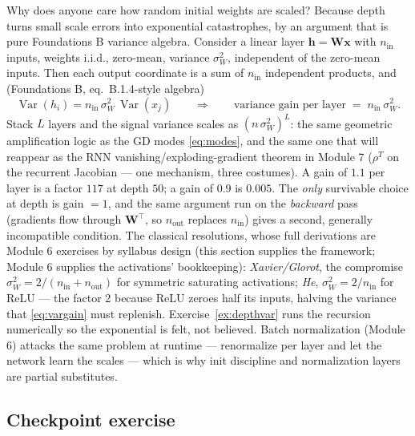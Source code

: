 \documentclass[11pt]{article}
\numberwithin{equation}{section}
\theoremstyle{plain}
\theoremstyle{definition}
\theoremstyle{remark}
\newcounter{exercise}
\DeclareMathOperator{\Var}{Var}
\newcommand{\x}{\bm{x}}
\newcommand{\T}{\top}
\begin{document}
Why does anyone care how random initial weights are scaled? Because depth turns small scale errors into exponential catastrophes, by an argument that is pure Foundations B variance algebra. Consider a linear layer $\bm h = \bm{W}\x$ with $n_{\mathrm{in}}$ inputs, weights i.i.d., zero-mean, variance $\sigma_W^2$, independent of the zero-mean inputs. Then each output coordinate is a sum of $n_{\mathrm{in}}$ independent products, and (Foundations B, eq.\ B.1.4-style algebra)
\begin{equation}
\Var(h_i) = n_{\mathrm{in}}\, \sigma_W^2\, \Var(x_j)
\qquad\Longrightarrow\qquad
\text{variance gain per layer} \;=\; n_{\mathrm{in}}\, \sigma_W^2 .
\label{eq:vargain}
\end{equation}
Stack $L$ layers and the signal variance scales as $(n\,\sigma_W^2)^L$: the same geometric amplification logic as the GD modes \eqref{eq:modes}, and the same one that will reappear as the RNN vanishing/exploding-gradient theorem in Module 7 ($\rho^T$ on the recurrent Jacobian --- one mechanism, three costumes). A gain of $1.1$ per layer is a factor $117$ at depth $50$; a gain of $0.9$ is $0.005$. The \emph{only} survivable choice at depth is gain $= 1$, and the same argument run on the \emph{backward} pass (gradients flow through $\bm W^\T$, so $n_{\mathrm{out}}$ replaces $n_{\mathrm{in}}$) gives a second, generally incompatible condition. The classical resolutions, whose full derivations are Module 6 exercises by syllabus design (this section supplies the framework; Module 6 supplies the activations' bookkeeping): \emph{Xavier/Glorot}, the compromise $\sigma_W^2 = 2/(n_{\mathrm{in}} + n_{\mathrm{out}})$ for symmetric saturating activations; \emph{He}, $\sigma_W^2 = 2/n_{\mathrm{in}}$ for ReLU --- the factor 2 because ReLU zeroes half its inputs, halving the variance that \eqref{eq:vargain} must replenish. Exercise~\ref{ex:depthvar} runs the recursion numerically so the exponential is felt, not believed. Batch normalization (Module 6) attacks the same problem at runtime --- renormalize per layer and let the network learn the scales --- which is why init discipline and normalization layers are partial substitutes.


\subsection*{Checkpoint exercise}
\end{document}
